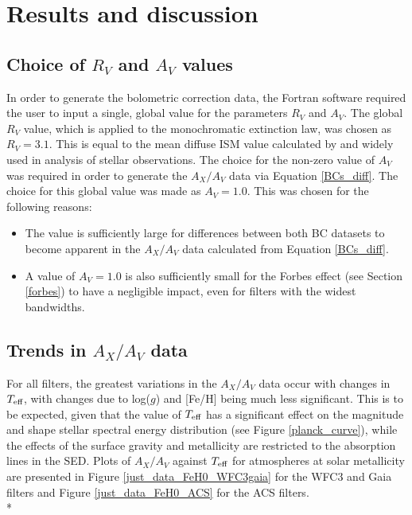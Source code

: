\documentclass[12pt, a4paper]{report}
\begin{document}
\chapter{Results and discussion}

\section{Choice of $R_{V}$ and $A_{V}$ values}
In order to generate the bolometric correction data, the Fortran software required the user to input a single, global value for the parameters $R_{V}$ and $A_{V}$. The global $R_{V}$ value, which is applied to the \cite{1989ApJ...345..245C} monochromatic extinction law, was chosen as $R_{V} = 3.1$. This is equal to the mean diffuse ISM value calculated by \cite{1985ApJ...288..618R} and widely used in analysis of stellar observations. The choice for the non-zero value of $A_{V}$ was required in order to generate the $A_{X}/A_{V}$ data via Equation \ref{BCs_diff}. The choice for this global value was made as $A_{V} = 1.0$. This was chosen for the following reasons:

\begin{itemize}
\item The value is sufficiently large for differences between both BC datasets to become apparent in the $A_{X}/A_{V}$ data calculated from Equation \ref{BCs_diff}.
\item A value of $A_{V} = 1.0$ is also sufficiently small for the Forbes effect (see Section \ref{forbes}) to have a negligible impact, even for filters with the widest bandwidths.
\end{itemize}

\section{Trends in $A_{X}/A_{V}$ data}
For all filters, the greatest variations in the $A_{X}/A_{V}$ data occur with changes in $T_{\textnormal{eff}}$, with changes due to log($g$) and [Fe/H] being much less significant. This is to be expected, given that the value of $T_{\textnormal{eff}}$ has a significant effect on the magnitude and shape stellar spectral energy distribution (see Figure \ref{planck_curve}), while the effects of the surface gravity and metallicity are restricted to the absorption lines in the SED. Plots of $A_{X}/A_{V}$ against $T_{\textnormal{eff}}$ for atmospheres at solar metallicity are presented in Figure \ref{just_data_FeH0_WFC3gaia} for the WFC3 and Gaia filters and Figure \ref{just_data_FeH0_ACS} for the ACS filters. \\*
\end{document}

